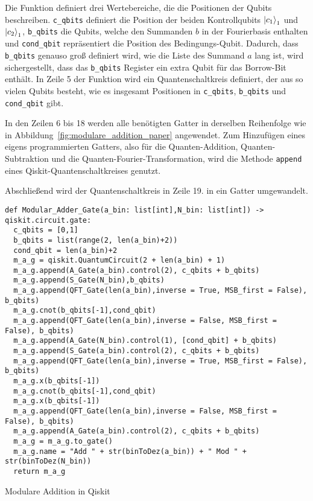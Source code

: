 Die Funktion definiert drei Wertebereiche, die die Positionen der Qubits beschreiben.
\texttt{c_qbits} definiert die Position der beiden Kontrollqubits \(\ket{c_1}_1\) und \(\ket{c_2}_1\), 
\texttt{b_qbits} die Qubits, welche den Summanden \(b\) 
in der Fourierbasis enthalten 
und \texttt{cond_qbit} repräsentiert die Position des Bedingungs-Qubit.
Dadurch, dass \texttt{b_qbits} genauso groß definiert wird, 
wie die Liste des Summand \(a\) lang ist, wird sichergestellt, 
dass das \texttt{b_qbits} Register ein extra Qubit für das Borrow-Bit enthält.
In Zeile 5 der Funktion wird ein Quantenschaltkreis definiert, 
der aus so vielen Qubits besteht, wie es insgesamt Positionen in 
\texttt{c_qbits}, \texttt{b_qbits} und \texttt{cond_qbit} gibt.

In den Zeilen 6 bis 18 werden alle benötigten Gatter 
in derselben Reihenfolge wie in Abbildung~\ref{fig:modulare_addition_paper} angewendet.
Zum Hinzufügen eines eigens programmierten Gatters, 
also für die Quanten-Addition, Quanten-Subtraktion und die Quanten-Fourier-Transformation,
wird die Methode \texttt{append} eines Qiskit-Quantenschaltkreises genutzt.

Abschließend wird der Quantenschaltkreis in Zeile 19. in ein Gatter umgewandelt.

\begin{listing}[H]
\begin{verbatim}    
def Modular_Adder_Gate(a_bin: list[int],N_bin: list[int]) -> qiskit.circuit.gate:
  c_qbits = [0,1]
  b_qbits = list(range(2, len(a_bin)+2))
  cond_qbit = len(a_bin)+2
  m_a_g = qiskit.QuantumCircuit(2 + len(a_bin) + 1) 
  m_a_g.append(A_Gate(a_bin).control(2), c_qbits + b_qbits)
  m_a_g.append(S_Gate(N_bin),b_qbits)
  m_a_g.append(QFT_Gate(len(a_bin),inverse = True, MSB_first = False), b_qbits)
  m_a_g.cnot(b_qbits[-1],cond_qbit)
  m_a_g.append(QFT_Gate(len(a_bin),inverse = False, MSB_first = False), b_qbits)
  m_a_g.append(A_Gate(N_bin).control(1), [cond_qbit] + b_qbits)
  m_a_g.append(S_Gate(a_bin).control(2), c_qbits + b_qbits)
  m_a_g.append(QFT_Gate(len(a_bin),inverse = True, MSB_first = False), b_qbits)
  m_a_g.x(b_qbits[-1])
  m_a_g.cnot(b_qbits[-1],cond_qbit)
  m_a_g.x(b_qbits[-1])
  m_a_g.append(QFT_Gate(len(a_bin),inverse = False, MSB_first = False), b_qbits)
  m_a_g.append(A_Gate(a_bin).control(2), c_qbits + b_qbits)
  m_a_g = m_a_g.to_gate()
  m_a_g.name = "Add " + str(binToDez(a_bin)) + " Mod " + str(binToDez(N_bin))
  return m_a_g
  \end{verbatim}
  \caption{Modulare Addition in Qiskit}
  \label{code:ModularAddition}
\end{listing}

